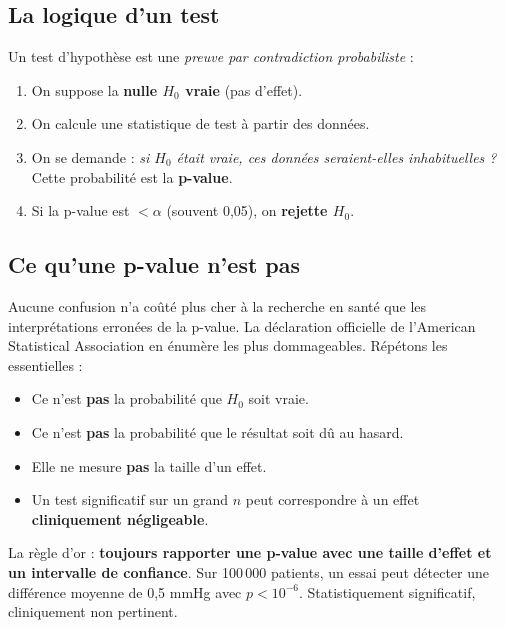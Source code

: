 \documentclass[11pt,a4paper]{article}
\begin{document}
\subsection{La logique d'un test}

Un test d'hypoth\`ese est une \emph{preuve par contradiction
probabiliste} :

\begin{enumerate}
  \item On suppose la \textbf{nulle $H_0$ vraie} (pas d'effet).
  \item On calcule une statistique de test \`a partir des donn\'ees.
  \item On se demande : \emph{si $H_0$ \'etait vraie, ces donn\'ees
        seraient-elles inhabituelles ?} Cette probabilit\'e est la
        \textbf{p-value}.
  \item Si la p-value est $< \alpha$ (souvent 0,05), on \textbf{rejette
        $H_0$}.
\end{enumerate}

\subsection{Ce qu'une p-value n'est pas}

Aucune confusion n'a co\^ut\'e plus cher \`a la recherche en sant\'e que
les interpr\'etations erron\'ees de la p-value. La d\'eclaration officielle
de l'American Statistical Association \citep{wasserstein2016asa} en
\'enum\`ere les plus dommageables. R\'ep\'etons les essentielles :

\begin{itemize}
  \item Ce n'est \textbf{pas} la probabilit\'e que $H_0$ soit vraie.
  \item Ce n'est \textbf{pas} la probabilit\'e que le r\'esultat soit
        d\^u au hasard.
  \item Elle ne mesure \textbf{pas} la taille d'un effet.
  \item Un test significatif sur un grand $n$ peut correspondre \`a un
        effet \textbf{cliniquement n\'egligeable}.
\end{itemize}

\begin{attention}
La r\`egle d'or : \textbf{toujours rapporter une p-value avec une taille
d'effet et un intervalle de confiance}. Sur 100\,000 patients, un essai
peut d\'etecter une diff\'erence moyenne de 0,5 mmHg avec
$p < 10^{-6}$. Statistiquement significatif, cliniquement non pertinent.
\end{attention}
\end{document}
